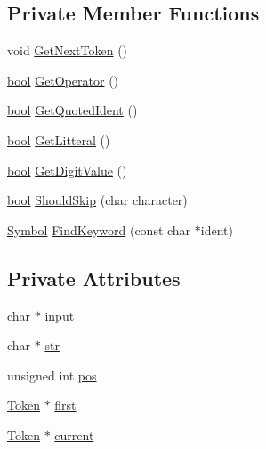 \subsection*{Private Member Functions}
\begin{DoxyCompactItemize}
\item 
void \hyperlink{classLexer_a0f32556fc91f85a9ad55ed52321d2ae0}{Get\+Next\+Token} ()
\item 
\hyperlink{platform_8h_a1062901a7428fdd9c7f180f5e01ea056}{bool} \hyperlink{classLexer_a6d8ab3a715307bf89fdfa8f83879c3cf}{Get\+Operator} ()
\item 
\hyperlink{platform_8h_a1062901a7428fdd9c7f180f5e01ea056}{bool} \hyperlink{classLexer_a3444c8c0450b3cd82bb395627095769b}{Get\+Quoted\+Ident} ()
\item 
\hyperlink{platform_8h_a1062901a7428fdd9c7f180f5e01ea056}{bool} \hyperlink{classLexer_a1a2555bec4f29b19fc0edd3989237110}{Get\+Litteral} ()
\item 
\hyperlink{platform_8h_a1062901a7428fdd9c7f180f5e01ea056}{bool} \hyperlink{classLexer_a9cb42b9797270ecbd944d5c5f3043c3a}{Get\+Digit\+Value} ()
\item 
\hyperlink{platform_8h_a1062901a7428fdd9c7f180f5e01ea056}{bool} \hyperlink{classLexer_a864c73023ef6b437a8d58c8158fbc6be}{Should\+Skip} (char character)
\item 
\hyperlink{lex_8h_a7feef761cd73fac6e25b8bb80d2c4e54}{Symbol} \hyperlink{classLexer_ab2f2c675530801d7cc1052b3ca4d1d68}{Find\+Keyword} (const char $\ast$ident)
\end{DoxyCompactItemize}
\subsection*{Private Attributes}
\begin{DoxyCompactItemize}
\item 
char $\ast$ \hyperlink{classLexer_a9ef909535b14de749d95e5a48217f1c9}{input}
\item 
char $\ast$ \hyperlink{classLexer_ab2ebe8e8906184cb2e58ec6779c5f9e7}{str}
\item 
unsigned int \hyperlink{classLexer_a91a95d9b5edaf25f634fabecaf7f40b5}{pos}
\item 
\hyperlink{structToken}{Token} $\ast$ \hyperlink{classLexer_a46cf6921cad18dcebca5eeae831dd9b9}{first}
\item 
\hyperlink{structToken}{Token} $\ast$ \hyperlink{classLexer_a64f66ae0d280ab2d4f4b8e2ac5d8c4c5}{current}
\end{DoxyCompactItemize}


